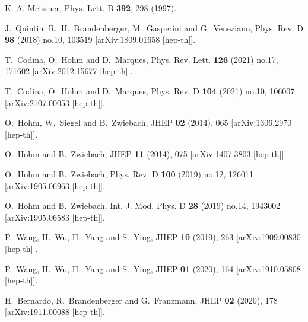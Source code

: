 \documentclass[a4paper,11pt]{article}
\begin{document}
\begin{thebibliography}{99}
K. A. Meissner, 
Phys. Lett. B {\bf 392}, 298 (1997).

J.~Quintin, R.~H.~Brandenberger, M.~Gasperini and G.~Veneziano,
Phys. Rev. D \textbf{98} (2018) no.10, 103519
[arXiv:1809.01658 [hep-th]].

T.~Codina, O.~Hohm and D.~Marques,
Phys. Rev. Lett. \textbf{126} (2021) no.17, 171602
[arXiv:2012.15677 [hep-th]].

T.~Codina, O.~Hohm and D.~Marques,
Phys. Rev. D \textbf{104} (2021) no.10, 106007
[arXiv:2107.00053 [hep-th]].

O.~Hohm, W.~Siegel and B.~Zwiebach,
JHEP \textbf{02} (2014), 065
[arXiv:1306.2970 [hep-th]].

O.~Hohm and B.~Zwiebach,
JHEP \textbf{11} (2014), 075
[arXiv:1407.3803 [hep-th]].

O.~Hohm and B.~Zwiebach,
Phys. Rev. D \textbf{100} (2019) no.12, 126011
[arXiv:1905.06963 [hep-th]].

O.~Hohm and B.~Zwiebach,
Int. J. Mod. Phys. D \textbf{28} (2019) no.14, 1943002
[arXiv:1905.06583 [hep-th]].

P.~Wang, H.~Wu, H.~Yang and S.~Ying,
JHEP \textbf{10} (2019), 263
[arXiv:1909.00830 [hep-th]].

P.~Wang, H.~Wu, H.~Yang and S.~Ying,
JHEP \textbf{01} (2020), 164
[arXiv:1910.05808 [hep-th]].

H.~Bernardo, R.~Brandenberger and G.~Franzmann,
JHEP \textbf{02} (2020), 178
[arXiv:1911.00088 [hep-th]].


\end{thebibliography}
\end{document}
